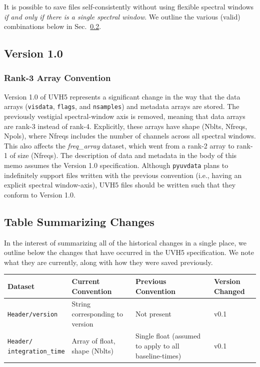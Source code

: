 \documentclass[11pt, oneside]{article}
\begin{document}
It is possible to save files self-consistently without using flexible spectral
windows \textit{if and only if there is a single spectral window}. We outline
the various (valid) combinations below in Sec.~\ref{sec:version_table}.


\subsection{Version 1.0}

\subsubsection{Rank-3 Array Convention}
\label{sec:rank3_arrays}
Version 1.0 of UVH5 represents a significant change in the way that the data
arrays (\verb+visdata+, \verb+flags+, and \verb+nsamples+) and metadata arrays
are stored. The previously vestigial spectral-window axis is removed, meaning
that data arrays are rank-3 instead of rank-4. Explicitly, these arrays have
shape (Nblts, Nfreqs, Npols), where Nfreqs includes the number of channels
across all spectral windows. This also affects the \textit{freq\_array} dataset,
which went from a rank-2 array to rank-1 of size (Nfreqs). The description of
data and metadata in the body of this memo assumes the Version 1.0
specification. Although \verb+pyuvdata+ plans to indefinitely support files
written with the previous convention (i.e., having an explicit spectral
window-axis), UVH5 files should be written such that they conform to Version
1.0.

\subsection{Table Summarizing Changes}
\label{sec:version_table}
In the interest of summarizing all of the historical changes in a single place,
we outline below the changes that have occurred in the UVH5 specification. We
note what they are currently, along with how they were saved
previously.

\begin{center}
  \begin{tabular}{ m{8em} | m{10em} | m{10em} | m{4em} }
    \textbf{Dataset} & \makecell[cl]{\textbf{Current}\\\textbf{Convention}} & \makecell[cl]{\textbf{Previous}\\\textbf{Convention}} & \textbf{Version Changed} \\\hline\hline
    \texttt{Header/version} & String corresponding to version & Not present & v0.1 \\[1em] \hline
    \makecell[tl]{\texttt{Header/}\\\texttt{integration\_time}} & Array of float, shape (Nblts) & Single float (assumed to apply to all baseline-times) & v0.1 \\[1.75em]
  \end{tabular}
\end{center}
\end{document}
